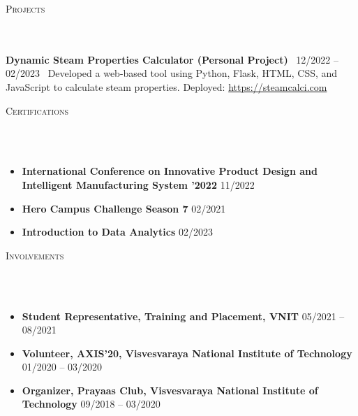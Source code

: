 \documentclass{article}
\newcommand{\lineunder}{
      \vspace*{-8pt} \\ \hspace*{-18pt} 
      \hrulefill \\
      }
\newcommand{\header}[1]{{
      \hspace*{-15pt}\vspace*{6pt} \textsc{#1}} \vspace*{-6pt} 
      \lineunder
      }
\begin{document}
    \vspace*{4pt}%
    \header{Projects}
    \textbf{Dynamic Steam Properties Calculator (Personal Project)} \
    12/2022 -- 02/2023 \
    Developed a web-based tool using Python, Flask, HTML, CSS, and JavaScript to calculate steam properties. Deployed: \url{https://steamcalci.com}


    \vspace*{4pt}%
    \header{Certifications}
    \begin{itemize}
      \item \textbf{International Conference on Innovative Product Design and Intelligent Manufacturing System '2022} \hfill 11/2022
      \item \textbf{Hero Campus Challenge Season 7} \hfill 02/2021
      \item \textbf{Introduction to Data Analytics} \hfill 02/2023
    \end{itemize}

    \vspace*{4pt}%
    \header{Involvements}
    \begin{itemize}
      \item \textbf{Student Representative, Training and Placement, VNIT} \hfill 05/2021 -- 08/2021
      \item \textbf{Volunteer, AXIS'20, Visvesvaraya National Institute of Technology} \hfill 01/2020 -- 03/2020
      \item \textbf{Organizer, Prayaas Club, Visvesvaraya National Institute of Technology} \hfill 09/2018 -- 03/2020
    \end{itemize}

    
\end{document}
